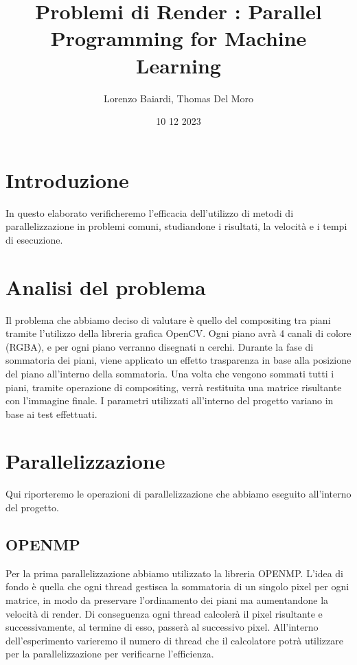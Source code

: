 \documentclass[11pt]{article}
\title{Problemi di Render : Parallel Programming for Machine Learning}
\author{Lorenzo Baiardi, Thomas Del Moro}
\date{10 12 2023}
\begin{document}
    \maketitle
    \clearpage

    \tableofcontents
    \clearpage

    \section{Introduzione}\label{sec:introduzione}
    In questo elaborato verificheremo l'efficacia dell'utilizzo di metodi di parallelizzazione in problemi comuni,
    studiandone i risultati, la velocità e i tempi di esecuzione.
    \clearpage

    \section{Analisi del problema}\label{sec:analisi-del-problema}
    Il problema che abbiamo deciso di valutare è quello del compositing tra piani tramite l'utilizzo della libreria
    grafica OpenCV\@.
    Ogni piano avrà 4 canali di colore (RGBA), e per ogni piano verranno disegnati n cerchi.
    Durante la fase di sommatoria dei piani, viene applicato un effetto trasparenza in base alla posizione del piano
    all'interno della sommatoria.
    Una volta che vengono sommati tutti i piani, tramite operazione di compositing, verrà restituita una matrice
    risultante con l'immagine finale.
    I parametri utilizzati all'interno del progetto variano in base ai test effettuati.
    \clearpage

    \section{Parallelizzazione}\label{sec:parallelizazzione}
    Qui riporteremo le operazioni di parallelizzazione che abbiamo eseguito all'interno del progetto.

    \subsection{OPENMP}\label{subsec:openmp}
    Per la prima parallelizzazione abbiamo utilizzato la libreria OPENMP\@.
    L'idea di fondo è quella che ogni thread gestisca la sommatoria di un singolo pixel per ogni matrice, in
    modo da preservare l'ordinamento dei piani ma aumentandone la velocità di render.
    Di conseguenza ogni thread calcolerà il pixel risultante e successivamente, al termine di esso, passerà
    al successivo pixel.
    All'interno dell'esperimento varieremo il numero di thread che il calcolatore potrà utilizzare per la
    parallelizzazione per verificarne l'efficienza.
\end{document}
